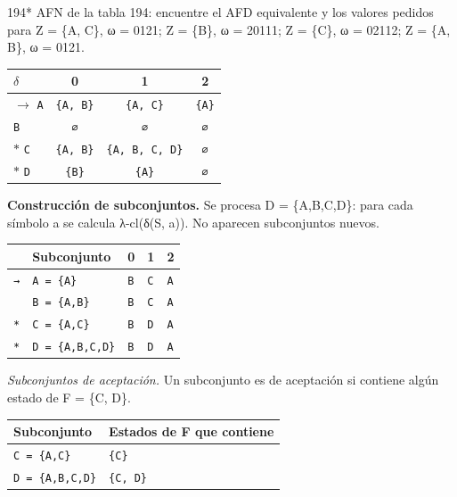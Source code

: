 \documentclass[11pt]{article}
\begin{document}
\begin{ejercicio}{194}{*}
AFN de la tabla 194: encuentre el AFD equivalente y los valores pedidos para Z = \{A, C\}, ω = 0121; Z = \{B\}, ω = 20111; Z = \{C\}, ω = 02112; Z = \{A, B\}, ω = 0121.
\end{ejercicio}
\proc \begin{center}\small\begin{tabular}{lccc}\toprule
$\delta$ & 0 & 1 & 2 \\\midrule
$\to$ \texttt{A} & \texttt{\{A, B\}} & \texttt{\{A, C\}} & \texttt{\{A\}} \\
 \texttt{B} & \texttt{∅} & \texttt{∅} & \texttt{∅} \\
$*$ \texttt{C} & \texttt{\{A, B\}} & \texttt{\{A, B, C, D\}} & \texttt{∅} \\
$*$ \texttt{D} & \texttt{\{B\}} & \texttt{\{A\}} & \texttt{∅} \\
\bottomrule\end{tabular}\end{center}
\textbf{Construcción de subconjuntos.} Se procesa D = \{A,B,C,D\}: para cada símbolo a se calcula λ-cl(δ(S, a)). No aparecen subconjuntos nuevos.
\begin{center}\footnotesize\begin{tabular}{lllll}\toprule
 & Subconjunto & 0 & 1 & 2 \\\midrule
\texttt{→} & \texttt{A = \{A\}} & \texttt{B} & \texttt{C} & \texttt{A} \\
\texttt{} & \texttt{B = \{A,B\}} & \texttt{B} & \texttt{C} & \texttt{A} \\
\texttt{*} & \texttt{C = \{A,C\}} & \texttt{B} & \texttt{D} & \texttt{A} \\
\texttt{*} & \texttt{D = \{A,B,C,D\}} & \texttt{B} & \texttt{D} & \texttt{A} \\
\bottomrule\end{tabular}\end{center}
\textit{Subconjuntos de aceptación.} Un subconjunto es de aceptación si contiene algún estado de F = \{C, D\}.
\begin{center}\footnotesize\begin{tabular}{ll}\toprule
Subconjunto & Estados de F que contiene \\\midrule
\texttt{C = \{A,C\}} & \texttt{\{C\}} \\
\texttt{D = \{A,B,C,D\}} & \texttt{\{C, D\}} \\
\bottomrule\end{tabular}\end{center}
\end{document}
